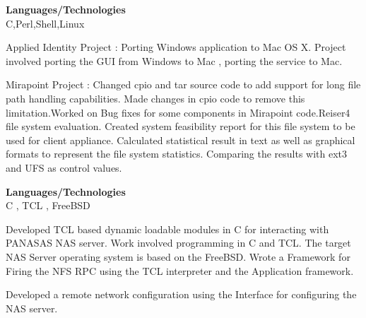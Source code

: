 \documentclass[a4,10pt]{cv4tw}
\begin{document}
                                                            {\textbf{Languages/Technologies} \\ C,Perl,Shell,Linux}
                                                            {
                                                                \begin{missions}
                                                                \item Applied Identity Project : Porting Windows application to Mac OS X. Project involved porting the GUI from Windows to Mac , porting the service to Mac.
                                                                \item Mirapoint Project : Changed cpio and tar source code to add support for long file path handling capabilities. Made changes in cpio code to remove this limitation.Worked on Bug fixes for some components in Mirapoint code.Reiser4 file system evaluation. Created system feasibility report for this file system to be used for client appliance. Calculated statistical result in text as well as graphical formats to represent the file system statistics. Comparing the results with ext3 and UFS as control values.
                                                                \end{missions}
                                                                }

                                                                {\textbf{Languages/Technologies} \\ C , TCL , FreeBSD}
                                                                {
                                                                    \begin{missions}
                                                                    \item Developed TCL based dynamic loadable modules in C for interacting with PANASAS NAS server. Work involved programming in C and TCL. The target NAS Server operating system is based on the FreeBSD. Wrote a Framework for Firing the NFS RPC using the TCL interpreter and the Application framework.
                                                                    \item Developed a remote network configuration using the  Interface for configuring the NAS server.
                                                                    \end{missions}
                                                                    }
\end{document}
